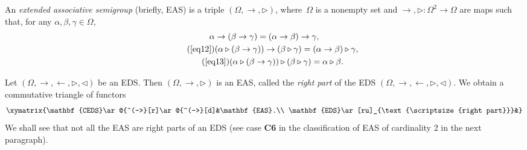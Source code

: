 \documentclass[10pt,a4paper]{amsart}
\numberwithin{equation}{section}
\begin{document}
\begin{Definition}
An \emph{extended associative semigroup} (briefly, EAS) is a triple $(\Omega,\rightarrow,\triangleright)$, where~$\Omega$ is a nonempty set and $\rightarrow,\triangleright\colon\Omega^2\longrightarrow \Omega$ are maps such that, for any $\alpha,\beta,\gamma \in \Omega$,
\begin{gather}
\label{eq19} \alpha \rightarrow (\beta \rightarrow \gamma) =(\alpha \rightarrow \beta) \rightarrow \gamma,\\
\tag{\ref{eq12}}(\alpha \triangleright (\beta \rightarrow \gamma))\rightarrow (\beta \triangleright \gamma) =(\alpha \rightarrow \beta)\triangleright \gamma,\\
\tag{\ref{eq13}}(\alpha \triangleright (\beta \rightarrow \gamma))\triangleright (\beta \triangleright \gamma) =\alpha \triangleright \beta.
\end{gather}\end{Definition}

\begin{Remark}
Let $(\Omega,\rightarrow,\leftarrow,\triangleright,\triangleleft)$ be an EDS. Then $(\Omega,\rightarrow,\triangleright)$ is an EAS, called the \emph{right part} of the EDS $(\Omega,\rightarrow,\leftarrow,\triangleright,\triangleleft)$.
We obtain a commutative triangle of functors
\[\xymatrix{\mathbf{CEDS}\ar@{^(->}[r]\ar@{^(->}[d]&\mathbf{EAS}.\\
\mathbf{EDS}\ar[ru]_{\text{\scriptsize{right part}}}&}\]
We shall see that not all the EAS are right parts of an EDS (see case \textbf{C6} in the classification of EAS of cardinality 2 in the next paragraph).
\end{Remark}
\end{document}
